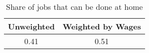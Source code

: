 \begin{table}[ht]
\centering
\caption{Share of jobs that can be done at home} 
\label{tab:canada}
\begin{tabular}{cc}
  \hline
Unweighted & Weighted by Wages \\ 
  \hline
0.41 & 0.51 \\ 
   \hline
\end{tabular}
\end{table}
